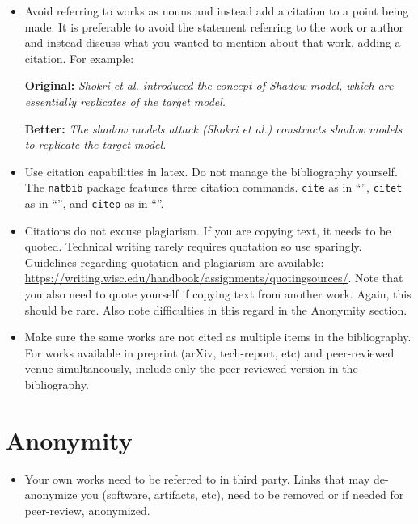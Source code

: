 \begin{itemize}
\item{} Avoid referring to works as nouns and instead add a citation to a point being made. It
  is preferable to avoid the statement referring to the work or author and instead discuss what
  you wanted to mention about that work, adding a citation. For example:

  \textbf{Original:} \textit{Shokri et al. introduced the concept of Shadow model, which are
    essentially replicates of the target model. }

  \textbf{Better:} \textit{The shadow models attack (Shokri et al.) constructs shadow models to
    replicate the target model. }

\item Use citation capabilities in latex. Do not manage the bibliography yourself. The
  \texttt{natbib} package features three citation commands. \verb|cite| as in
  ``\cite{leino2018influence}'', \verb|citet| as in ``\citet{leino2018influence}'', and
  \verb|citep| as in ``\cite{leino2018influence}''.

  \item{} Citations do not excuse plagiarism. If you are copying text, it needs to be quoted.
    Technical writing rarely requires quotation so use sparingly. Guidelines regarding quotation
    and plagiarism are available:
    \url{https://writing.wisc.edu/handbook/assignments/quotingsources/}. Note that you also need to
    quote yourself if copying text from another work. Again, this should be rare. Also note
    difficulties in this regard in the Anonymity section.

  \item{} Make sure the same works are not cited as multiple items in the bibliography. For works
    available in preprint (arXiv, tech-report, etc) and peer-reviewed venue simultaneously, include
    only the peer-reviewed version in the bibliography.

\end{itemize}


\section{Anonymity}

\begin{itemize}
  \item{} Your own works need to be referred to in third party. Links that may de-anonymize you
    (software, artifacts, etc), need to be removed or if needed for peer-review, anonymized.
\end{itemize}


